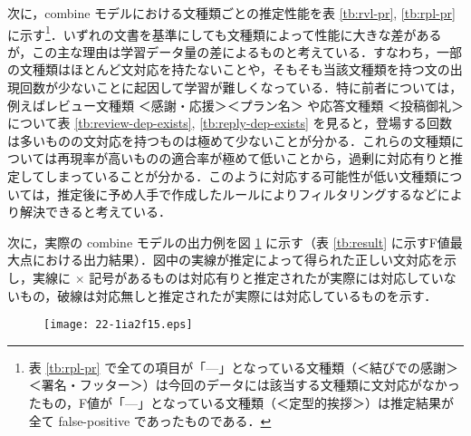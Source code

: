 \documentclass[japanese]{jnlp_1.4}
\begin{document}
\begin{table}[b]
\begin{minipage}[t]{205pt}
\setlength{\captionwidth}{190pt}
\label{tb:rvl-pr}

\end{minipage}
\begin{minipage}[t]{205pt}
\setlength{\captionwidth}{190pt}
\label{tb:rpl-pr}

\end{minipage}
\end{table}

次に，combine モデルにおける文種類ごとの推定性能を表 \ref{tb:rvl-pr}, \ref{tb:rpl-pr} に示す\footnote{表 \ref{tb:rpl-pr} で全ての項目が「---」となっている文種類（＜結びでの感謝＞ ＜署名・フッター＞）は今回のデータには該当する文種類に文対応がなかったもの，F値が「---」となっている文種類（＜定型的挨拶＞）は推定結果が全て false-positive であったものである．}．いずれの文書を基準にしても文種類によって性能に大きな差があるが，この主な理由は学習データ量の差によるものと考えている．すなわち，一部の文種類はほとんど文対応を持たないことや，そもそも当該文種類を持つ文の出現回数が少ないことに起因して学習が難しくなっている．特に前者については，例えばレビュー文種類 ＜感謝・応援＞＜プラン名＞ や応答文種類 ＜投稿御礼＞ について表 \ref{tb:review-dep-exists}, \ref{tb:reply-dep-exists} を見ると，登場する回数は多いものの文対応を持つものは極めて少ないことが分かる．これらの文種類については再現率が高いものの適合率が極めて低いことから，過剰に対応有りと推定してしまっていることが分かる．このように対応する可能性が低い文種類については，推定後に予め人手で作成したルールによりフィルタリングするなどにより解決できると考えている．

次に，実際の combine モデルの出力例を図 \ref{fig:result-ex} に示す（表 \ref{tb:result} に示すF値最大点における出力結果）．図中の実線が推定によって得られた正しい文対応を示し，実線に $\times$ 記号があるものは対応有りと推定されたが実際には対応していないもの，破線は対応無しと推定されたが実際には対応しているものを示す．

\begin{figure}[b]
\begin{center}
\texttt{[image: 22-1ia2f15.eps]}
\end{center}
\label{fig:result-ex}
\end{figure}
\end{document}
